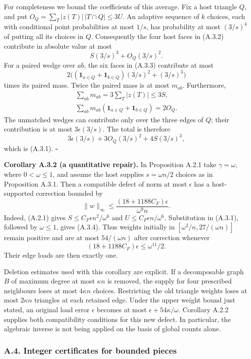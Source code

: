 \documentclass[english,11pt,a4paper]{article}
\begin{document}
For completeness we bound the coefficients of this average. Fix a host triangle \(Q\), and put \(O_Q=\sum_T|z(T)|\,|T\cap Q|\le3U\). An adaptive sequence of \(k\) choices, each with conditional point probabilities at most \(1/s\), has probability at most \((3/s)^k\) of putting all its choices in \(Q\). Consequently the four host faces in (A.3.2) contribute in absolute value at most \[S(3/s)^3+O_Q(3/s)^2.\] For a paired wedge over \(ab\), the six faces in (A.3.3) contribute at most \[2\bigl((\mathbf1_{a\in Q}+\mathbf1_{b\in Q})(3/s)^2+(3/s)^3\bigr)\] times its paired mass. Twice the paired mass is at most \(m_{ab}\). Furthermore, \[\begin{gathered}
\sum_{ab}m_{ab}=3\sum_T|z(T)|\le3S,\\
\sum_{ab}m_{ab}(\mathbf1_{a\in Q}+\mathbf1_{b\in Q})=2O_Q.
\end{gathered}\] The unmatched wedges can contribute only over the three edges of \(Q\); their contribution is at most \(3\epsilon(3/s)\). The total is therefore \[3\epsilon(3/s)+3O_Q(3/s)^2+4S(3/s)^3,\] which is (A.3.1). \(\square\)

\textbf{Corollary A.3.2 (a quantitative repair).} In Proposition A.2.1 take \(\gamma=\omega\), where \(0<\omega\le1\), and assume the host supplies \(s=\omega n/2\) choices as in Proposition A.3.1. Then a compatible defect of norm at most \(\epsilon\) has a host-supported correction bounded by \[\|w\|_\infty\le
\frac{(18+1188C_F)\epsilon}{\omega^9n}.
\tag{A.3.4}\] Indeed, (A.2.1) gives \(S\le C_F\epsilon n^2/\omega^6\) and \(U\le C_F\epsilon n/\omega^6\). Substitution in (A.3.1), followed by \(\omega\le1\), gives (A.3.4). Thus weights initially in \([\omega^2/n,27/(\omega n)]\) remain positive and are at most \(54/(\omega n)\) after correction whenever \[(18+1188C_F)\epsilon\le\omega^{11}/2.
\tag{A.3.5}\] Their edge loads are then exactly one.

Deletion estimates used with this corollary are explicit. If a decomposable graph \(B\) of maximum degree at most \(\kappa n\) is removed, the supply for four prescribed neighbours loses at most \(4\kappa n\) choices. Restricting the old triangle weights loses at most \(2\kappa n\) triangles at each retained edge. Under the upper weight bound just stated, an original load error \(\epsilon\) becomes at most \(\epsilon+54\kappa/\omega\). Corollary A.2.2 supplies both compatibility conditions for this new defect. In particular, the algebraic inverse is not being applied on the basis of global counts alone.

\subsubsection{A.4. Integer certificates for bounded pieces}\label{a.4.-integer-certificates-for-bounded-pieces}
\end{document}
